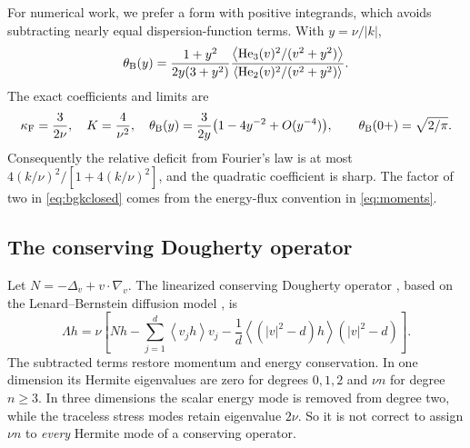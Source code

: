 \documentclass[11pt]{article}
\newcommand{\av}[1]{\left\langle #1\right\rangle}
\newcommand{\F}{\kappa_{\mathrm F}}
\newcommand{\He}{\mathrm{He}}
\theoremstyle{definition}
\theoremstyle{remark}
\numberwithin{equation}{section}
\begin{document}
For numerical work, we prefer a form with positive integrands, which
avoids subtracting nearly equal dispersion-function terms.
With $y=\nu/|k|$,
\begin{equation}
 \theta_{\rm B}(y)=
 \frac{1+y^2}{2y(3+y^2)}
 \frac{\av{\He_3(v)^2/(v^2+y^2)}}
      {\av{\He_2(v)^2/(v^2+y^2)}}.
 \label{eq:bgkclosed}
\end{equation}
The exact coefficients and limits are
\begin{equation}
 \F=\frac{3}{2\nu},\quad K=\frac4{\nu^2},\quad
 \theta_{\rm B}(y)=\frac{3}{2y}\bigl(1-4y^{-2}+O(y^{-4})\bigr),
 \qquad \theta_{\rm B}(0+)=\sqrt{2/\pi}.
 \label{eq:bgklimits}
\end{equation}
Consequently the relative deficit from Fourier's law is at most
$4(k/\nu)^2/[1+4(k/\nu)^2]$, and the quadratic coefficient is sharp.
The factor of two in \eqref{eq:bgkclosed} comes from the energy-flux
convention in \eqref{eq:moments}.

\subsection{The conserving Dougherty operator}\label{sec:dougherty}

Let $N=-\Delta_v+v\cdot\nabla_v$. The linearized conserving
Dougherty operator \cite{Dougherty1964}, based on the
Lenard--Bernstein diffusion model \cite{LenardBernstein1958}, is
\begin{equation}
 \Lambda h=\nu\left[
 Nh-\sum_{j=1}^d\av{v_jh}v_j
       -\frac1d\av{(|v|^2-d)h}(|v|^2-d)\right].
 \label{eq:dougherty}
\end{equation}
The subtracted terms restore momentum and energy conservation.
In one dimension its Hermite eigenvalues are zero for degrees $0,1,2$
and $\nu n$ for degree $n\geq3$. In three dimensions the scalar energy
mode is removed from degree two, while the traceless stress modes retain
eigenvalue $2\nu$. So it is not correct to assign $\nu n$ to
\emph{every} Hermite mode of a conserving operator.
\end{document}
